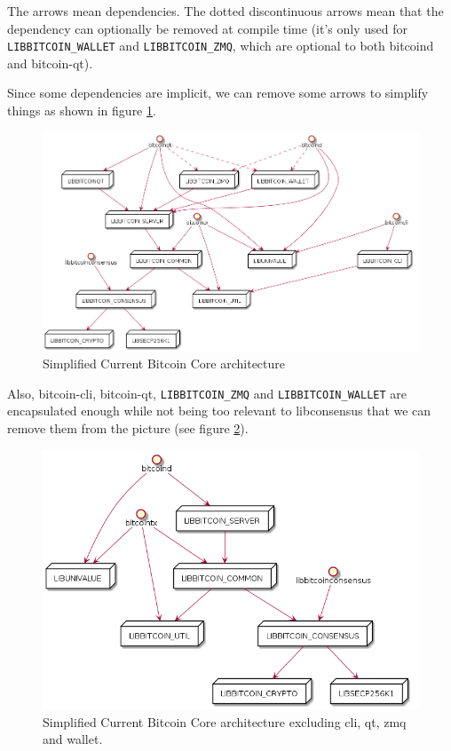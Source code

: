 \documentclass[11pt]{article}
\begin{document}
The arrows mean dependencies. The dotted discontinuous arrows mean
that the dependency can optionally be removed at compile time (it's
only used for \texttt{LIBBITCOIN\_WALLET} and \texttt{LIBBITCOIN\_ZMQ}, which are optional to both bitcoind
and bitcoin-qt).

Since some dependencies are implicit, we can remove some arrows to
simplify things as shown in figure \ref{pic_2_current_less_arrows}.

\begin{figure}[htb]
\centering
\includegraphics[width=.9\linewidth]{./img/2_current_less_arrows.png}
\caption{\label{pic_2_current_less_arrows}Simplified Current Bitcoin Core architecture}
\end{figure}

Also, bitcoin-cli, bitcoin-qt, \texttt{LIBBITCOIN\_ZMQ} and \texttt{LIBBITCOIN\_WALLET} are
encapsulated enough while not being too relevant to libconsensus that
we can remove them from the picture (see figure \ref{pic_3_current_simpler}).

\begin{figure}[htb]
\centering
\includegraphics[width=.9\linewidth]{./img/3_current_simpler.png}
\caption{\label{pic_3_current_simpler}Simplified Current Bitcoin Core architecture excluding cli, qt, zmq and wallet.}
\end{figure}
\end{document}
